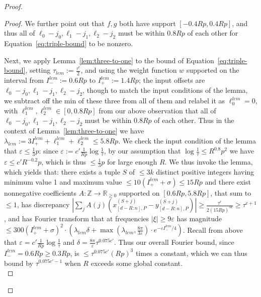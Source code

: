 \documentclass[11pt]{article}
\theoremstyle{plain}
\newcommand{\eps}{\varepsilon}
\begin{document}
\begin{proof}
\begin{proof}
    We further point out that $f,g$ both have support $[-0.4Rp,0.4Rp]$, and thus all of $\ell_0-j_0,\ell_1-j_1,\ell_2-j_2$ must be within $0.8Rp$ of each other for Equation~\ref{eq:triple-bound} to be nonzero.

    Next, we apply Lemma~\ref{lem:three-to-one} to the bound of Equation~\ref{eq:triple-bound}, setting $\tau_{lem}:=\frac{\tau^c}{2}$, and using the weight function $w$ supported on the interval from $I_-^{lem}:=0.6Rp$ to $I_+^{lem}:=1.4Rp$; the input offsets are $\ell_0-j_0,\ell_1-j_1,\ell_2-j_2$, though to match the input conditions of the lemma, we subtract off the min of these three from all of them and relabel it as $\ell_0^{lem}=0$, with $\ell_1^{lem},\ell_2^{lem}\in[0,0.8Rp]$ from our above observation that all of $\ell_0-j_0,\ell_1-j_1,\ell_2-j_2$ must be within $0.8Rp$ of each other. Thus in the context of Lemma~\ref{lem:three-to-one} we have $\lambda_{lem}:= 3I_+^{lem}+\ell_1^{lem}+\ell_2^{lem}\leq 5.8Rp$. We check the input condition of the lemma that $\eps\leq\frac{1}{3}p$: since $\eps:=c' \frac{1}{Rp}\log\frac{1}{\tau}$, by our assumption that $\log\frac{1}{\tau}\leq R^{0.8}p^2$ we have $\eps\leq c' R^{-0.2} p$, which is thus $\leq\frac{1}{3}p$ for large enough $R$. We thus invoke the lemma, which yields that: there exists a tuple $S$ of $\leq 3k$ distinct positive integers having minimum value 1 and maximum value $\leq 10(I_+^{lem}+\sigma)\leq 15Rp$ and there exist nonnegative coefficients $A:\mathbb{Z}\rightarrow \mathbb{R}_{\geq 0}$ supported on $[0.6Rp,5.8Rp]$, that sum to $\leq 1$, has discrepancy $|\sum_j A(j)(x_{[d-R:n],P}^{(S+j)}-y_{[d-R:n],P}^{(S+j)})|\geq \frac{\tau^c}{2(15Rp)^{3k}}\geq\tau^{c+1}$, and has Fourier transform that at frequencies $|\xi|\geq 9\eps$ has magnitude  $\leq 300 (I_+^{lem}+\sigma)^2\cdot\left(\lambda_{lem}\delta+\max(\lambda_{lem},\frac{8\pi}{3\eps})\cdot e^{-\eps I_-^{lem}/4}\right)$. Recall from above that $\eps=c' \frac{1}{Rp}\log\frac{1}{\tau}$ and $\delta=\frac{8\pi}{\eps} \tau^{0.075 c'}$. Thus our overall Fourier bound, since $I_-^{lem}=0.6Rp\geq 0.3Rp$, is $\leq \tau^{0.075c'} (Rp)^3$ times a constant, which we can thus bound by $\tau^{0.075c'-1}$ when $R$ exceeds some global constant. \\


\end{proof}
\end{proof}
\end{document}

